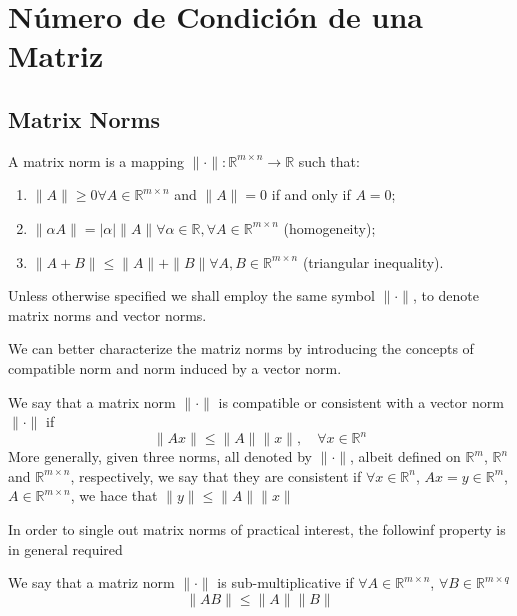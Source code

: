 \chapter{Número de Condición de una Matriz}
\section{Matrix Norms}
\begin{definition}
    A matrix norm is a mapping $\|\cdot\|: \mathbb{R}^{m \times n} \rightarrow \mathbb{R}$ such that:
    \begin{enumerate}
        \item $\|A\| \geq 0 \forall A \in \mathbb{R}^{m \times n}$ and $\|A\| = 0$ if and only if $A = 0$;
        \item $\|\alpha A\| = |\alpha| \|A\| \forall \alpha \in \mathbb{R}, \forall A \in \mathbb{R}^{m \times n}$ (homogeneity);
        \item $\| A + B\| \leq \|A\| + \|B\| \forall A, B \in \mathbb{R}^{m \times n}$ (triangular inequality).
    \end{enumerate}
    \label{Def: 1.19}
\end{definition}

Unless otherwise specified we shall employ the same symbol $\|\cdot\|$, to denote matrix norms and vector norms.

We can better characterize the matriz norms by introducing the concepts of compatible norm and norm induced by a vector norm.

\begin{definition}
    We say that a matrix norm $\|\cdot\|$ is compatible or consistent with a vector norm $\|\cdot\|$ if 
    \begin{equation}
        \|Ax\| \leq \|A\| \|x\|, \quad \forall x \in \mathbb{R}^n
        \label{Eq: (1.16)}
    \end{equation}
    More generally, given three norms, all denoted by $\|\cdot\|$, albeit defined on $\mathbb{R}^m$, $\mathbb{R}^n$ and $\mathbb{R}^{m \times n}$, respectively, we say that they are consistent if $\forall x \in \mathbb{R}^n$, $Ax = y \in \mathbb{R}^m$, $A \in \mathbb{R}^{m \times n}$, we hace that $\|y\| \leq \|A\| \|x\|$
\end{definition}

In order to single out matrix norms of practical interest, the followinf property is in general required

\begin{definition}
    We say that a matriz norm $\| \cdot \|$ is sub-multiplicative if $\forall A \in \mathbb{R}^{m \times n}$, $\forall B \in \mathbb{R}^{m \times q}$
    \begin{equation}
        \| A B\| \leq \|A\| \|B\|
        \label{Eq: (1.17)}
    \end{equation}
\end{definition}

